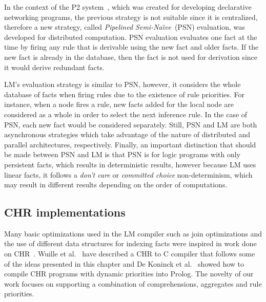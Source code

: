 In the context of the P2 system~\cite{Loo-condie-garofalakis-p2}, which was
created for developing declarative networking programs, the previous strategy is
not suitable since it is centralized, therefore a new strategy, called
\emph{Pipelined Semi-Na\"{\i}ve}~(PSN) evaluation, was developed for distributed
computation. PSN evaluation evaluates one fact at the time by firing any rule
that is derivable using the new fact and older facts. If the new fact is already
in the database, then the fact is not used for derivation since it would derive
redundant facts.

LM's evaluation strategy is similar to PSN, however, it considers the whole
database of facts when firing rules due to the existence of rule priorities.
For instance, when a node fires a rule, new facts added for the local node are
considered as a whole in order to select the next inference rule. In the case of
PSN, each new fact would be considered separately. Still, PSN and LM are both
asynchronous strategies which take advantage of the nature of distributed and
parallel architectures, respectively. Finally, an important distinction that
should be made between PSN and LM is that PSN is for logic programs with only
persistent facts, which results in deterministic results, however because LM
uses linear facts, it follows a \emph{don't care} or \emph{committed choice}
non-determinism, which may result in different results depending on the order of
computations.

\subsection{CHR implementations}

Many basic optimizations used in the LM compiler such as join optimizations and
the use of different data structures for indexing facts were inspired in work
done on CHR~\cite{DBLP:journals/corr/cs-PL-0408025}.  Wuille et al.~\cite{42866}
have described a CHR to C compiler that follows some of the ideas presented in
this chapter and De Koninck et al.~\cite{chrp} showed how to compile CHR
programs with dynamic priorities into Prolog. The novelty of our work focuses on
supporting a combination of comprehensions, aggregates and rule priorities.

